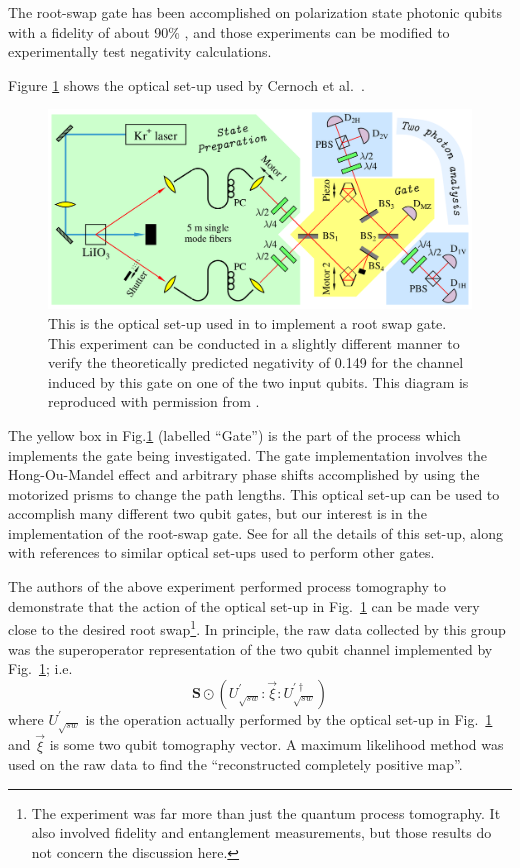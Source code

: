 The root-swap gate has been accomplished on polarization state photonic qubits with a fidelity of about 90\% \cite{Cernoch2008}, and those experiments can be modified to experimentally test negativity calculations.  

Figure \ref{fig:opticalneg} shows the optical set-up used by Cernoch et al.\ \cite{Cernoch2008}.  
\begin{figure}[h!t]
\centering
\includegraphics[scale=1.5]{opticalneg1.png}
\caption{This is the optical set-up used in \cite{Cernoch2008} to implement a root swap gate.  This experiment can be conducted in a slightly different manner to verify the theoretically predicted negativity of 0.149 for the channel induced by this gate on one of the two input qubits.  This diagram is reproduced with permission from \cite{Cernoch2008}.}
\label{fig:opticalneg}
\end{figure}
The yellow box in Fig.\ref{fig:opticalneg} (labelled ``Gate'') is the part of the process which implements the gate being investigated.  The gate implementation involves the Hong-Ou-Mandel effect and arbitrary phase shifts accomplished by using the motorized prisms to change the path lengths.  This optical set-up can be used to accomplish many different two qubit gates, but our interest is in the implementation of the root-swap gate.  See \cite{Cernoch2008} for all the details of this set-up, along with references to similar optical set-ups used to perform other gates.   

The authors of the above experiment performed process tomography to demonstrate that the action of the optical set-up in Fig.\ \ref{fig:opticalneg} can be made very close to the desired root swap\footnote{The experiment was far more than just the quantum process tomography.  It also involved fidelity and entanglement measurements, but those results do not concern the discussion here.}.  In principle, the raw data collected by this group was the superoperator representation of the two qubit channel implemented by Fig.\ \ref{fig:opticalneg}; i.e.\
$$
\mathbf{S} \odot \left( U_{\sqrt{sw}}^\prime: \vec{\xi} :U_{\sqrt{sw}}^{\prime\dagger}\right)
$$
where $U_{\sqrt{sw}}^\prime$ is the operation actually performed by the optical set-up in Fig.\ \ref{fig:opticalneg} and $\vec{\xi}$ is some two qubit tomography vector.  A maximum likelihood method was used on the raw data to find the ``reconstructed completely positive map''.

